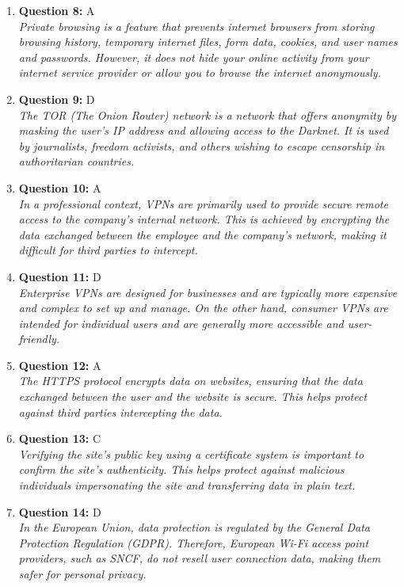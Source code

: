 \documentclass[12pt,a4paper]{article}
\begin{document}
\begin{enumerate}
\item \textbf{Question 8:} A
\\ \textit{Private browsing is a feature that prevents internet
browsers from storing browsing history, temporary internet
files, form data, cookies, and user names and passwords.
However, it does not hide your online activity from your
internet service provider or allow you to browse the
internet anonymously.}

\item \textbf{Question 9:} D
\\ \textit{The TOR (The Onion Router) network is a network that offers
anonymity by masking the user's IP address and allowing
access to the Darknet. It is used by journalists, freedom
activists, and others wishing to escape censorship in
authoritarian countries.}

\item \textbf{Question 10:} A
\\ \textit{In a professional context, VPNs are primarily used to
provide secure remote access to the company's internal
network. This is achieved by encrypting the data exchanged
between the employee and the company's network, making it
difficult for third parties to intercept.}

\item \textbf{Question 11:} D
\\ \textit{Enterprise VPNs are designed for businesses and are
typically more expensive and complex to set up and manage.
On the other hand, consumer VPNs are intended for
individual users and are generally more accessible and
user-friendly.}

\item \textbf{Question 12:} A
\\ \textit{The HTTPS protocol encrypts data on websites,
ensuring that the data exchanged between the user and the
website is secure. This helps protect against third parties
intercepting the data.}

\item \textbf{Question 13:} C
\\ \textit{Verifying the site's public key using a certificate system
is important to confirm the site's authenticity. This
helps protect against malicious individuals impersonating
the site and transferring data in plain text.}

\item \textbf{Question 14:} D
\\ \textit{In the European Union, data protection is regulated by the
General Data Protection Regulation (GDPR). Therefore,
European Wi-Fi access point providers, such as SNCF, do not
resell user connection data, making them safer for personal privacy.}


\end{enumerate}
\end{document}
